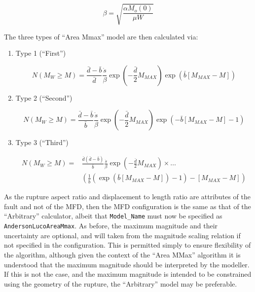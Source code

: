 \begin{equation}
\beta=\sqrt{\frac{\alpha M_o \left( 0 \right)}{\mu W}}
\end{equation}

The three types of \cite{AndersonLuco1983} ``Area Mmax'' model are then calculated via:

\begin{enumerate}

\item Type 1 (``First'')

\begin{equation}
N \left( {M_W \geq M} \right) = \frac{\bar{d} - \bar{b}}{\bar{d}} \frac{\dot{s}}{\beta} \exp \left( {-\frac{\bar{d}}{2} M_{MAX}} \right) \exp \left( {\bar{b} \left[ {M_{MAX} - M} \right]} \right)
\end{equation}


\item Type 2 (``Second'')

\begin{equation}
N \left( {M_W \geq M} \right) = \frac{\bar{d} - \bar{b}}{\bar{b}}  \frac{\dot{s}}{\beta} \exp \left( {-\frac{\bar{d}}{2} M_{MAX}} \right)  \exp \left( {-\bar{b} \left[ {M_{MAX} - M} \right] - 1} \right)
\end{equation}

\item Type 3 (``Third'')

\begin{equation}
\begin{split}
N \left( {M_W \geq M} \right) = & \frac{\bar{d} \left( {\bar{d} - \bar{b}} \right)}{\bar{b}} \frac{\dot{s}}{\beta} \exp \left( {-\frac{\bar{d}}{2} M_{MAX}} \right) \times \ldots \\ 
& \left( {\frac{1}{\bar{b}} \left( {\exp \left( {\bar{b} \left[ {M_{MAX} - M} \right]} \right) - 1} \right) - \left[ {M_{MAX} - M} \right]} \right)
\end{split}
\end{equation}

\end{enumerate}

As the rupture aspect ratio and displacement to length ratio are attributes of the fault and not of the MFD, then the MFD configuration is the same as that of the \cite{AndersonLuco1983} ``Arbitrary'' calculator, albeit that \verb=Model_Name= must now be specified as \verb=AndersonLucoAreaMmax=. As before, the maximum magnitude and their uncertainty are optional, and will taken from the magnitude scaling relation if not specified in the configuration. This is permitted simply to ensure flexibility of the algorithm, although given the context of the ``Area MMax'' algorithm it is understood that the maximum magnitude should be interpreted by the modeller. If this is not the case, and the maximum magnitude is intended to be constrained using the geometry of the rupture, the ``Arbitrary'' model may be preferable.


